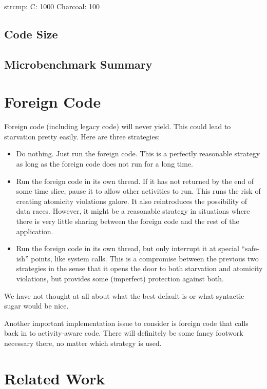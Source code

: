 \documentclass[10pt,preprint]{sigplanconf}
\begin{document}
strcmp: C: 1000 Charcoal: 100

\subsection{Code Size}

\subsection{Microbenchmark Summary}

\section{Foreign Code}

Foreign code (including legacy code) will never yield.  This could lead
to starvation pretty easily.  Here are three strategies:

\begin{itemize}
\item Do nothing.
  Just run the foreign code.
  This is a perfectly reasonable strategy as long as the foreign code does not run for a long time.
\item Run the foreign code in its own thread.
  If it has not returned by the end of some time slice, pause it to allow other activities to run.
  This runs the risk of creating atomicity violations galore.
  It also reintroduces the possibility of data races.
  However, it might be a reasonable strategy in situations where there is very little sharing between the foreign code and the rest of the application.
\item Run the foreign code in its own thread, but only interrupt it at special ``safe-ish'' points, like system calls.
  This is a compromise between the previous two strategies in the sense that it opens the door to both starvation and atomicity violations, but provides some (imperfect) protection against both.
\end{itemize}

We have not thought at all about what the best default is or what syntactic sugar would be nice.

Another important implementation issue to consider is foreign code that calls back in to activity-aware code.
There will definitely be some fancy footwork necessary there, no matter which strategy is used.

\section{Related Work}
\end{document}
